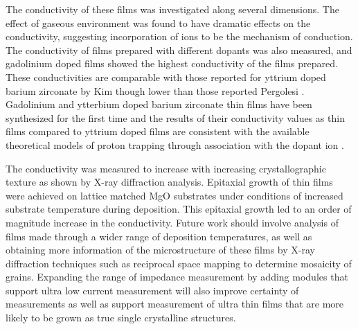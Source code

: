The conductivity of these films was investigated along several dimensions. The effect of gaseous environment was found to have dramatic effects on the conductivity, suggesting incorporation of ions to be the mechanism of conduction. The conductivity of films prepared with different dopants was also measured, and gadolinium doped films showed the highest conductivity of the films prepared. These conductivities are comparable with those reported for yttrium doped barium zirconate by Kim \cite{Kim2011} though lower than those reported Pergolesi \cite{Pergolesi2010}. Gadolinium and ytterbium doped barium zirconate thin films have been synthesized for the first time and the results of their conductivity values as thin films compared to yttrium doped films are consistent with the available theoretical models of proton trapping through association with the dopant ion \cite{Stokes2010}. 

The conductivity was measured to increase with increasing crystallographic texture as shown by X-ray diffraction analysis. Epitaxial growth of thin films were achieved on lattice matched MgO substrates under conditions of increased substrate temperature during deposition. This epitaxial growth led to an order of magnitude increase in the conductivity. Future work should involve analysis of films made through a wider range of deposition temperatures, as well as obtaining more information of the microstructure of these films by X-ray diffraction techniques such as reciprocal space mapping to determine mosaicity of grains. Expanding the range of impedance measurement by adding modules that support ultra low current measurement will also improve certainty of measurements as well as support measurement of ultra thin films that are more likely to be grown as true single crystalline structures.